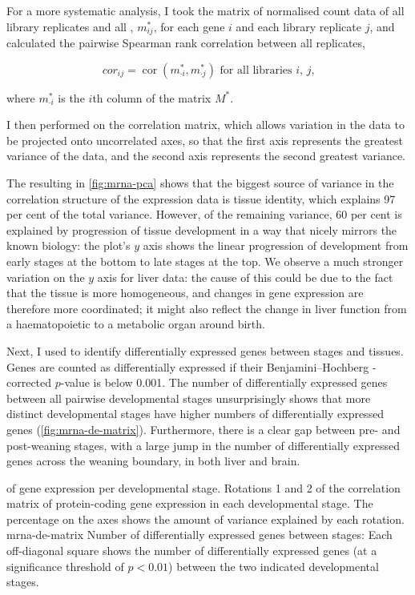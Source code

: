 For a more systematic analysis, I took the matrix of normalised count data of
all library replicates and all \mrna[s], \(m_{ij}^*\), for each \mrna gene \(i\)
and each library replicate \(j\), and calculated the pairwise Spearman rank
correlation between all replicates,

\begin{equation}
    cor_{ij} = \operatorname{cor}(m_{\cdot i}^*, m_{\cdot j}^*) \text{\ for all
        libraries \(i\), \(j\),}
\end{equation}

where \(m_{\cdot i}^*\) is the \(i\)th column of the matrix \(M^*\).

I then performed \pca on the correlation matrix, which allows variation in the
data to be projected onto uncorrelated axes, so that the first axis represents
the greatest variance of the data, and the second axis represents the second
greatest variance.

The resulting \pca in \cref{fig:mrna-pca} shows that the biggest source of
variance in the correlation structure of the expression data is tissue identity,
which explains \num{97} per cent of the total variance. However, of the
remaining variance, \num{60} per cent is explained by progression of tissue
development in a way that nicely mirrors the known biology: the plot’s \(y\)
axis shows the linear progression of development from early stages at the bottom
to late stages at the top. We observe a much stronger variation on the \(y\)
axis for liver data: the cause of this could be due to the fact that the tissue
is more homogeneous, and changes in gene expression are therefore more
coordinated; it might also reflect the change in liver function from a
haematopoietic to a metabolic organ around birth.

Next, I used  \citep{Love:2014} to identify differentially
expressed genes between stages and tissues. Genes are counted as differentially
expressed if their Benjamini–Hochberg \fdr-corrected \(p\)-value is below
\num{0.001}. The number of differentially expressed genes between all pairwise
developmental stages unsurprisingly shows that more distinct developmental
stages have higher numbers of differentially expressed genes
(\cref{fig:mrna-de-matrix}). Furthermore, there is a clear gap between pre- and
post-weaning stages, with a large jump in the number of differentially expressed
genes across the weaning boundary, in both liver and brain.

    {\pca of \mrna gene expression per developmental stage.}
    {Rotations \num{1} and \num{2} of the correlation matrix of
    protein-coding gene expression in each developmental stage. The percentage
    on the axes shows the amount of variance explained by each rotation.}
    {mrna-de-matrix}
    {Number of differentially expressed \mrna genes between stages:}
    {Each off-diagonal square shows the number of differentially
    expressed genes (at a significance threshold of \(p<0.01\)) between
    the two indicated developmental stages.}

